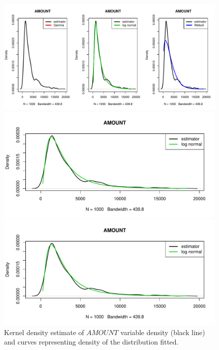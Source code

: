 \documentclass[10pt]{article}\usepackage[]{graphicx}\usepackage[]{color}
\newenvironment{knitrout}{}{} %
\begin{document}
\begin{figure}[h!]
\centering
\begin{knitrout}
\color{fgcolor}
\includegraphics[width=.95\linewidth]{figure/unnamed-chunk-4-1} 

\includegraphics[width=.95\linewidth]{figure/unnamed-chunk-4-2} 

\includegraphics[width=.95\linewidth]{figure/unnamed-chunk-4-3} 

\end{knitrout}
\caption{Kernel density estimate of $AMOUNT$ variable density (black line) and curves representing density of the distribution fitted.}
\end{figure}
\end{document}
